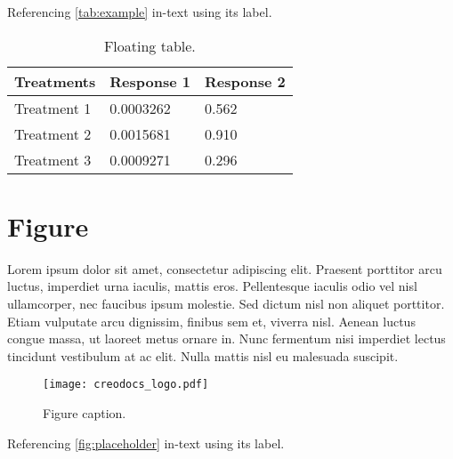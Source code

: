 \documentclass[
	11pt, %
	fleqn, %
	a4paper, %
]{LegrandOrangeBook}
\begin{document}
Referencing \autoref{tab:example} in-text using its label.

\begin{table}[t] %
	\centering %
	\begin{tabular}{L{0.15\textwidth} R{0.15\textwidth} R{0.15\textwidth}} %
		\toprule
		\textbf{Treatments} & \textbf{Response 1} & \textbf{Response 2}\\
		\midrule
		Treatment 1 & 0.0003262 & 0.562 \\
		Treatment 2 & 0.0015681 & 0.910 \\
		Treatment 3 & 0.0009271 & 0.296 \\
		\bottomrule
	\end{tabular}
	\caption{Floating table.}
	\label{tab:floating} %
\end{table}


\section{Figure}

Lorem ipsum dolor sit amet, consectetur adipiscing elit. Praesent porttitor arcu luctus, imperdiet urna iaculis, mattis eros. Pellentesque iaculis odio vel nisl ullamcorper, nec faucibus ipsum molestie. Sed dictum nisl non aliquet porttitor. Etiam vulputate arcu dignissim, finibus sem et, viverra nisl. Aenean luctus congue massa, ut laoreet metus ornare in. Nunc fermentum nisi imperdiet lectus tincidunt vestibulum at ac elit. Nulla mattis nisl eu malesuada suscipit.

\begin{figure}[H] %
	\centering %
	\texttt{[image: creodocs\_logo.pdf]} %
	\caption{Figure caption.}
	\label{fig:placeholder} %
\end{figure}

Referencing \autoref{fig:placeholder} in-text using its label.
\end{document}
